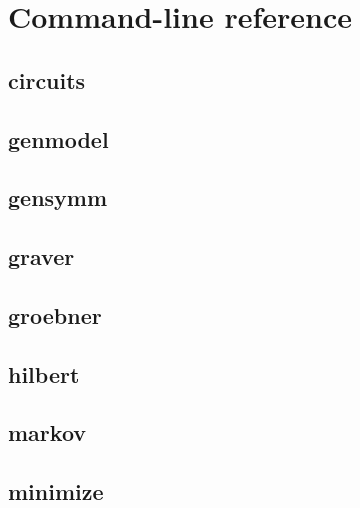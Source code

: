 \chapter{Command-line reference}
\label{Chapter: Reference}

\section{circuits}
{\small
}

\clearpage
\section{genmodel}
{\small
}

\clearpage
\section{gensymm}
{\small
}

\clearpage
\section{graver}

{\small
}

\clearpage
\section{groebner}

{\small
}

\clearpage
\section{hilbert}

{\small
}

\clearpage
\section{markov}

{\small
}

\clearpage
\section{minimize}

{\small
}

